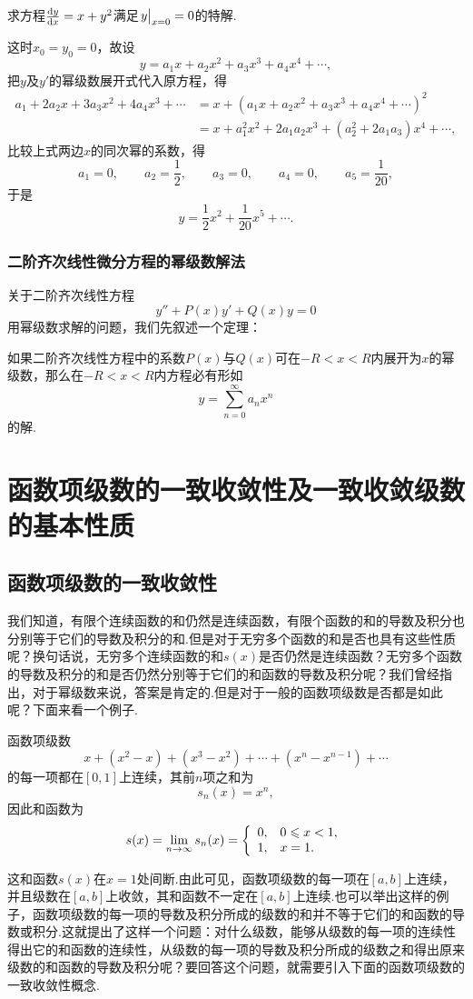 \begin{example}
求方程\(\dv{y}{x} = x + y^2\)满足\(\eval{y}_{x=0}=0\)的特解.
\begin{solution}
这时\(x_0=y_0=0\)，故设\[
y = a_1 x + a_2 x^2 + a_3 x^3 + a_4 x^4 + \dotsb,
\]把\(y\)及\(y'\)的幂级数展开式代入原方程，得\begin{align*}
a_1 + 2a_2 x + 3a_3 x^2 + 4a_4 x^3 + \dotsb
&= x + (a_1 x + a_2 x^2 + a_3 x^3 + a_4 x^4 + \dotsb)^2 \\
&= x + a_1^2 x^2 + 2a_1a_2 x^3 + (a_2^2 + 2a_1a_3) x^4 + \dotsb,
\end{align*}
比较上式两边\(x\)的同次幂的系数，得\[
a_1 = 0, \qquad
a_2 = \frac{1}{2}, \qquad
a_3 = 0, \qquad
a_4 = 0, \qquad
a_5 = \frac{1}{20},
\]于是\[
y = \frac{1}{2} x^2 + \frac{1}{20} x^5 + \dotsb.
\]
\end{solution}
\end{example}

\subsubsection{二阶齐次线性微分方程的幂级数解法}
关于二阶齐次线性方程\[
y'' + P(x) y' + Q(x) y = 0
\]用幂级数求解的问题，我们先叙述一个定理：
\begin{theorem}
如果二阶齐次线性方程中的系数\(P(x)\)与\(Q(x)\)可在\(-R<x<R\)内展开为\(x\)的幂级数，那么在\(-R<x<R\)内方程必有形如\[
y = \sum\limits_{n=0}^{\infty} a_n x^n
\]的解.
\end{theorem}

\section{函数项级数的一致收敛性及一致收敛级数的基本性质}
\subsection{函数项级数的一致收敛性}
我们知道，有限个连续函数的和仍然是连续函数，有限个函数的和的导数及积分也分别等于它们的导数及积分的和.但是对于无穷多个函数的和是否也具有这些性质呢？换句话说，无穷多个连续函数的和\(s(x)\)是否仍然是连续函数？无穷多个函数的导数及积分的和是否仍然分别等于它们的和函数的导数及积分呢？我们曾经指出，对于幂级数来说，答案是肯定的.但是对于一般的函数项级数是否都是如此呢？下面来看一个例子.
\begin{example}
函数项级数\[
x + (x^2-x) + (x^3-x^2) + \dotsb + (x^n-x^{n-1}) + \dotsb
\]的每一项都在\([0,1]\)上连续，其前\(n\)项之和为\[
s_n(x) = x^n,
\]因此和函数为\[
s(x) = \lim\limits_{n\to\infty} s_n(x)
= \left\{ \begin{array}{ll}
0, & 0 \leqslant x < 1, \\
1, & x = 1.
\end{array} \right.
\]
\end{example}
这和函数\(s(x)\)在\(x=1\)处间断.由此可见，函数项级数的每一项在\([a,b]\)上连续，并且级数在\([a,b]\)上收敛，其和函数不一定在\([a,b]\)上连续.也可以举出这样的例子，函数项级数的每一项的导数及积分所成的级数的和并不等于它们的和函数的导数或积分.这就提出了这样一个问题：对什么级数，能够从级数的每一项的连续性得出它的和函数的连续性，从级数的每一项的导数及积分所成的级数之和得出原来级数的和函数的导数及积分呢？要回答这个问题，就需要引入下面的函数项级数的一致收敛性概念.

